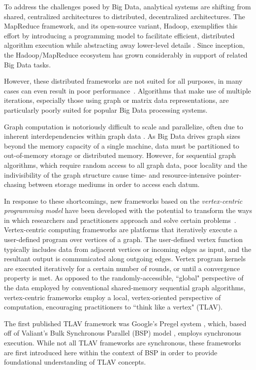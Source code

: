 \documentclass[reprint,twocolumn,showpacs,preprintnumbers,amsmath, aps,pre,amssymb]{revtex4-1}
\begin{document}
To address the challenges posed by Big Data, analytical systems are shifting from shared, centralized architectures to distributed, decentralized architectures.  The MapReduce framework, and its open-source variant, Hadoop, exemplifies this effort by introducing a programming model to facilitate efficient, distributed algorithm execution while abstracting away lower-level details \cite{Dean2008}.  Since inception, the Hadoop/MapReduce ecosystem has grown considerably in support of related Big Data tasks.  

However, these distributed frameworks are not suited for all purposes, in many cases can even result in poor performance~\cite{Munagala1999,Cohen2009,Kang2009}. Algorithms that make use of multiple iterations, especially those using graph or matrix data representations, are particularly poorly suited for popular Big Data processing systems. 

Graph computation is notoriously difficult to scale and parallelize, often due to inherent interdependencies within graph data \cite{Lumsdaine2007}.  As Big Data drives graph sizes beyond the memory capacity of a single machine, data must be partitioned to out-of-memory storage or distributed memory.  However, for sequential graph algorithms, which require random access to all graph data, poor locality and the indivisibility of the graph structure cause time- and resource-intensive pointer-chasing between storage mediums in order to access each datum.

In response to these shortcomings, new frameworks based on the {\em vertex-centric programming model} have been developed with the potential to transform the ways in which researchers and practitioners approach and solve certain problems~\cite{Malewicz2010}.  Vertex-centric computing frameworks are platforms that iteratively execute a user-defined program over vertices of a graph.  The user-defined vertex function typically includes data from adjacent vertices or incoming edges as input, and the resultant output is communicated along outgoing edges.  Vertex program kernels are executed iteratively for a certain number of rounds, or until a convergence property is met.  As opposed to the randomly-accessible, ``global" perspective of the data employed by conventional shared-memory sequential graph algorithms, vertex-centric frameworks employ a local, vertex-oriented perspective of computation, encouraging practitioners to ``think like a vertex" (TLAV).

The first published TLAV framework was Google's Pregel system \cite{Malewicz2010}, which, based off of Valiant's Bulk Synchronous Parallel (BSP) model \cite{Valiant1990}, employs synchronous execution.  While not all TLAV frameworks are synchronous, these frameworks are first introduced here within the context of BSP in order to provide foundational understanding of TLAV concepts.
\end{document}
